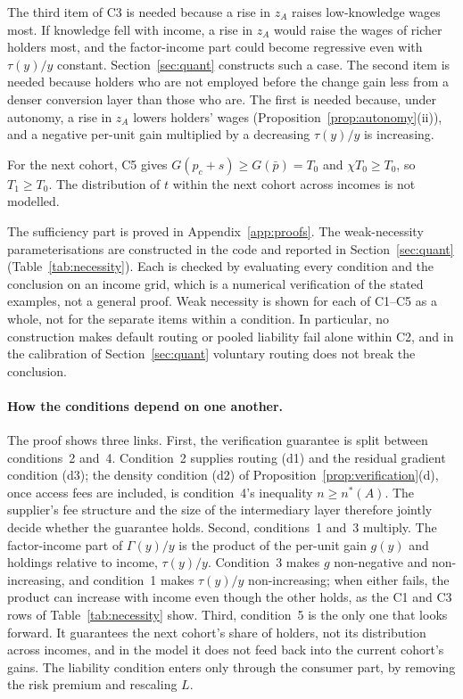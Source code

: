 \documentclass[12pt]{article}
\theoremstyle{remark}
\begin{document}
The third item of C3 is needed because a rise in $z_A$ raises low-knowledge wages most. If knowledge fell with income, a rise in $z_A$ would raise the wages of richer holders most, and the factor-income part could become regressive even with $\tau(y)/y$ constant. Section~\ref{sec:quant} constructs such a case. The second item is needed because holders who are not employed before the change gain less from a denser conversion layer than those who are. The first is needed because, under autonomy, a rise in $z_A$ lowers holders' wages (Proposition~\ref{prop:autonomy}(ii)), and a negative per-unit gain multiplied by a decreasing $\tau(y)/y$ is increasing.

For the next cohort, C5 gives $G(p_c+s)\ge G(\bar p)=T_0$ and $\chi T_0\ge T_0$, so $T_1\ge T_0$. The distribution of $t$ within the next cohort across incomes is not modelled.

The sufficiency part is proved in Appendix~\ref{app:proofs}. The weak-necessity parameterisations are constructed in the code and reported in Section~\ref{sec:quant} (Table~\ref{tab:necessity}). Each is checked by evaluating every condition and the conclusion on an income grid, which is a numerical verification of the stated examples, not a general proof. Weak necessity is shown for each of C1--C5 as a whole, not for the separate items within a condition. In particular, no construction makes default routing or pooled liability fail alone within C2, and in the calibration of Section~\ref{sec:quant} voluntary routing does not break the conclusion.

\paragraph{How the conditions depend on one another.} The proof shows three links. First, the verification guarantee is split between conditions~2 and~4. Condition~2 supplies routing (d1) and the residual gradient condition (d3); the density condition (d2) of Proposition~\ref{prop:verification}(d), once access fees are included, is condition~4's inequality $n\ge n^*(A)$. The supplier's fee structure and the size of the intermediary layer therefore jointly decide whether the guarantee holds. Second, conditions~1 and~3 multiply. The factor-income part of $\Gamma(y)/y$ is the product of the per-unit gain $g(y)$ and holdings relative to income, $\tau(y)/y$. Condition~3 makes $g$ non-negative and non-increasing, and condition~1 makes $\tau(y)/y$ non-increasing; when either fails, the product can increase with income even though the other holds, as the C1 and C3 rows of Table~\ref{tab:necessity} show. Third, condition~5 is the only one that looks forward. It guarantees the next cohort's share of holders, not its distribution across incomes, and in the model it does not feed back into the current cohort's gains. The liability condition enters only through the consumer part, by removing the risk premium and rescaling $L$.
\end{document}
